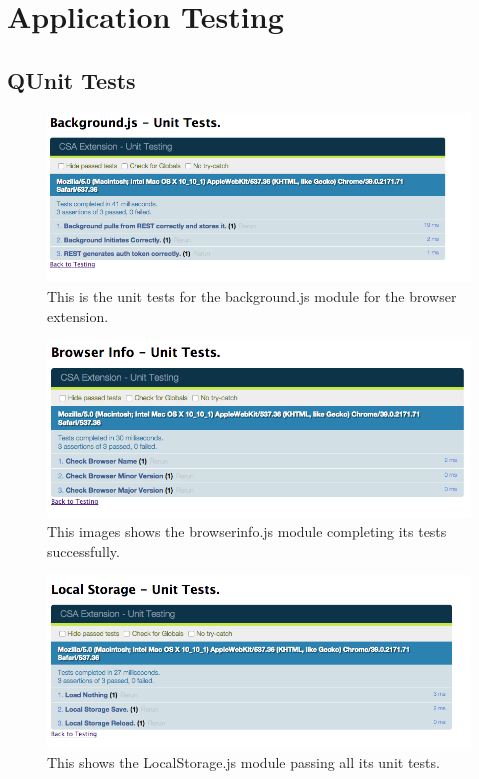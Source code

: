 \documentclass{article}
\begin{document}
\section{Application Testing}

\subsection{QUnit Tests}


\begin{figure}[H]
\centering
\includegraphics[width=\textwidth]{backgroundqunit}
\caption{This is the unit tests for the background.js module for the browser extension.}
\end{figure}

\begin{figure}[H]
\centering
\includegraphics[width=\textwidth]{biqunit}
\caption{This images shows the browserinfo.js module completing its tests successfully.}
\end{figure}

\begin{figure}[H]
\centering
\includegraphics[width=\textwidth]{lsqunit}
\caption{This shows the LocalStorage.js module passing all its unit tests.}
\end{figure}
\end{document}
